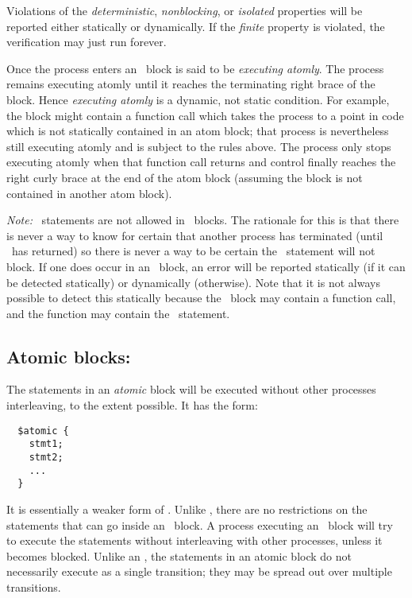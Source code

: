 Violations of the \emph{deterministic}, \emph{nonblocking}, or
\emph{isolated} properties will be reported either statically or
dynamically.  If the \emph{finite} property is violated, the
verification may just run forever.

Once the process enters an \catom\ block is said to be \emph{executing
  atomly}.  The process remains executing atomly until it reaches the
terminating right brace of the block.  Hence \emph{executing atomly}
is a dynamic, not static condition.  For example, the block might
contain a function call which takes the process to a point in code
which is not statically contained in an atom block; that process is
nevertheless still executing atomly and is subject to the rules above.
The process only stops executing atomly when that function call
returns and control finally reaches the right curly brace at the end
of the atom block (assuming the block is not contained in another atom
block).

\emph{Note:} \cwait\ statements are not allowed in \catom\ blocks.
The rationale for this is that there is never a way to know for
certain that another process has terminated (until \cwait\ has
returned) so there is never a way to be certain the \cwait\ statement
will not block.  If one does occur in an \catom\ block, an error will
be reported statically (if it can be detected statically) or
dynamically (otherwise).  Note that it is not always possible to
detect this statically because the \catom\ block may contain a
function call, and the function may contain the \cwait\ statement.

\subsection{Atomic blocks: \catomic} The statements in an \emph{atomic} block
will be executed without other processes interleaving, to
the extent possible.  It has the form:
\begin{verbatim}
  $atomic {
    stmt1;
    stmt2;
    ...
  }
\end{verbatim}
It is essentially a weaker form of \catom.  Unlike \catom, there are
no restrictions on the statements that can go inside an \catomic\
block.  A process executing an \catomic~block will try to execute the
statements without interleaving with other processes, unless it
becomes blocked.  Unlike an \catom, the statements in an atomic block
do not necessarily execute as a single transition; they may be spread
out over multiple transitions.


